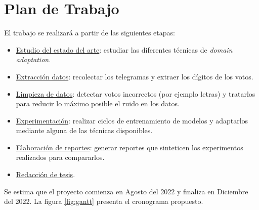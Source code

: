 \documentclass[a4paper, twoside, spanish]{report}
\begin{document}
\section*{Plan de Trabajo}

El trabajo se realizar\'a a partir de las siguientes etapas:
\begin{itemize}
	\item \underline{Estudio del estado del arte}: estudiar las diferentes t\'ecnicas
	      de {\it domain adaptation}.
	\item \underline{Extracci\'on datos}: recolectar los telegramas
	      y extraer los d\'igitos de los votos.
	\item \underline{Limpieza de datos}: detectar votos incorrectos (por ejemplo
	      letras) y tratarlos para reducir lo m\'aximo posible el ruido
	      en los datos.
	\item \underline{Experimentaci\'on}: realizar ciclos de entrenamiento de modelos
	      y adaptarlos mediante alguna de las t\'ecnicas disponibles.
	\item \underline{Elaboraci\'on de reportes}: generar reportes que sinteticen los
	      experimentos realizados para compararlos.
	\item \underline{Redacci\'on de tesis}.
\end{itemize}

Se estima que el proyecto comienza en Agosto del 2022 y finaliza en Diciembre del 2022. La figura \ref{fig:gantt}
presenta el cronograma propuesto.
\end{document}
